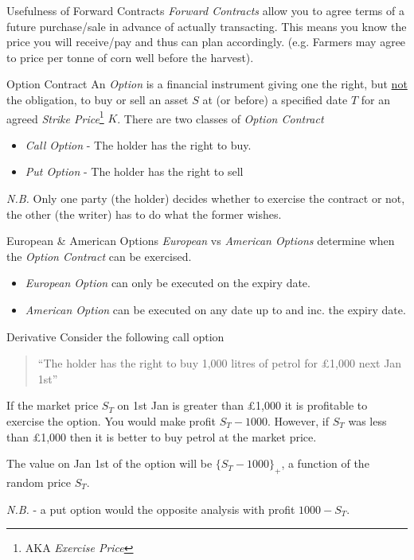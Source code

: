 \documentclass[11pt,a4paper]{article}
\begin{document}
  \begin{remark}{Usefulness of Forward Contracts}
    \textit{Forward Contracts} allow you to agree terms of a future purchase/sale in advance of actually transacting. This means you know the price you will receive/pay and thus can plan accordingly. (e.g. Farmers may agree to price per tonne of corn well before the harvest).
  \end{remark}

  \begin{definition}{Option Contract}
    An \textit{Option} is a financial instrument giving one the right, but \underline{not} the obligation, to buy or sell an asset $S$ at (or before) a specified date $T$ for an agreed \textit{Strike Price}\footnote{AKA \textit{Exercise Price}} $K$. There are two classes of \textit{Option Contract}
    \begin{itemize}
      \item \textit{Call Option} - The holder has the right to buy.
      \item \textit{Put Option} - The holder has the right to sell
    \end{itemize}
    \textit{N.B.} Only one party (the holder) decides whether to exercise the contract or not, the other (the writer) has to do what the former wishes.
  \end{definition}

  \begin{definition}{European \& American Options}
    \textit{European} vs \textit{American Options} determine when the \textit{Option Contract} can be exercised.
    \begin{itemize}
      \item \textit{European Option} can only be executed on the expiry date.
      \item \textit{American Option} can be executed on any date up to and inc. the expiry date.
    \end{itemize}
  \end{definition}

  \begin{example}{Derivative}
    Consider the following call option
    \begin{quote}
      ``The holder has the right to buy 1,000 litres of petrol for £1,000 next Jan 1st''
    \end{quote}
    If the market price $S_T$ on 1st Jan is greater than £1,000 it is profitable to exercise the option. You would make profit $S_T-1000$. However, if $S_T$ was less than £1,000 then it is better to buy petrol at the market price.
    \par The value on Jan 1st of the option will be $\{S_T-1000\}_+$, a function of the random price $S_T$.
    \par \textit{N.B.} - a put option would the opposite analysis with profit $1000-S_T$.
  \end{example}
\end{document}
